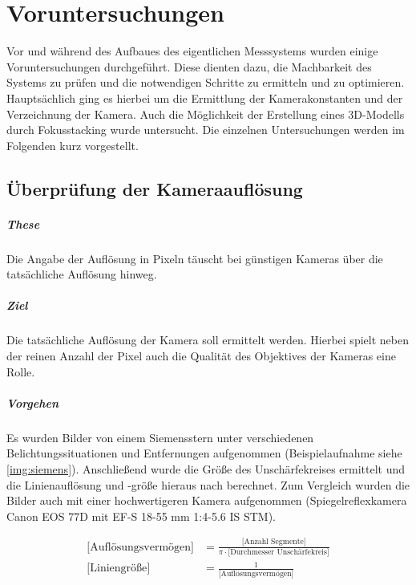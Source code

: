 \documentclass[./00PhotoBox.tex]{subfiles}
\begin{document}
\chapter{Voruntersuchungen}
\label{c:voruntersuchungen}
Vor und während des Aufbaues des eigentlichen Messsystems wurden einige Voruntersuchungen durchgeführt. Diese dienten dazu, die Machbarkeit des Systems zu prüfen und die notwendigen Schritte zu ermitteln und zu optimieren. Hauptsächlich ging es hierbei um die Ermittlung der Kamerakonstanten und der \Gls{Verzeichnung} der Kamera. Auch die Möglichkeit der Erstellung eines 3D-Modells durch Fokusstacking wurde untersucht. Die einzelnen Untersuchungen werden im Folgenden kurz vorgestellt.

\section{Überprüfung der Kameraauflösung}

\paragraph{These}
Die Angabe der Auflösung in Pixeln täuscht bei günstigen Kameras über die tatsächliche Auflösung hinweg.

\paragraph{Ziel}
Die tatsächliche Auflösung der Kamera soll ermittelt werden. Hierbei spielt neben der reinen Anzahl der Pixel auch die Qualität des Objektives der Kameras eine Rolle.

\paragraph{Vorgehen}
Es wurden Bilder von einem Siemensstern unter verschiedenen Belichtungssituationen und Entfernungen aufgenommen (Beispielaufnahme siehe \autoref{img:siemens}). Anschließend wurde die Größe des Unschärfekreises ermittelt und die Linienauflösung und -größe hieraus nach \cite[S. 161]{luhmann} berechnet. Zum Vergleich wurden die Bilder auch mit einer hochwertigeren Kamera aufgenommen (Spiegelreflexkamera Canon EOS 77D mit EF-S 18-55 mm 1:4-5.6 IS STM).

\begin{align*}
    \text{[Auflösungsvermögen]} & = \frac{\text{[Anzahl Segmente]}}{\pi \cdot \text{[Durchmesser Unschärfekreis]}} \\
    \text{[Liniengröße]}        & = \frac{1}{\text{[Auflösungsvermögen]}}
\end{align*}
\end{document}

